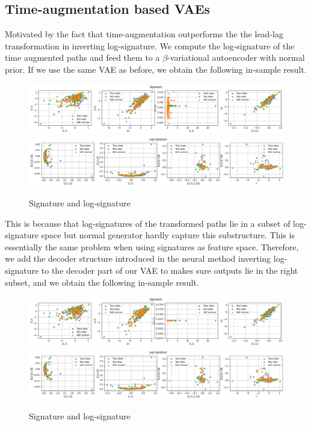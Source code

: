 \documentclass[12pt]{report}
\theoremstyle{definition}
\theoremstyle{remark}
\begin{document}
\subsection{Time-augmentation based VAEs}
Motivated by the fact that time-augmentation outperforms the the lead-lag transformation in inverting log-signature. We compute the log-signature of the time augmented paths and feed them to a $\beta$-variational autoencoder with normal prior. If we use the same VAE as before, we obtain the following in-sample result.
 \begin{figure}[H]
    \centering
    \includegraphics[width=\textwidth]{figs/cvae15.png}
    \includegraphics[width=\textwidth]{figs/cvae16.png}
    \caption{Signature and log-signature}
\end{figure}
This is because that log-signatures of the transformed paths lie in a subset of log-signature space but normal generator hardly capture this substructure. This is essentially the same problem when using signatures as feature space. Therefore, we add the decoder structure introduced in the neural method inverting log-signature to the decoder part of our VAE to makes sure outputs lie in the right subset, and we obtain the following in-sample result.
 \begin{figure}[H]
    \centering
    \includegraphics[width=\textwidth]{figs/cvae17.png}
    \includegraphics[width=\textwidth]{figs/cvae18.png}
    \caption{Signature and log-signature}
\end{figure}
\end{document}
